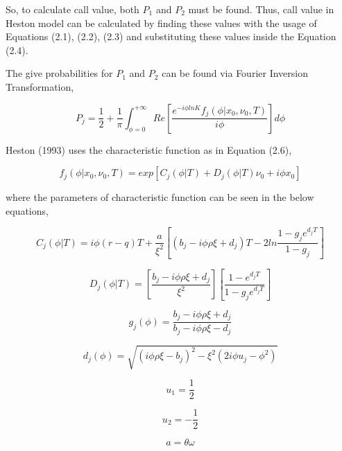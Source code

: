 \documentclass[fontsize=12pt]{article}
\numberwithin{equation}{section} %
\numberwithin{figure}{section} %
\numberwithin{table}{section} %
\begin{document}
	So, to calculate call value, both $P_1$ and $P_2$ must be found. Thus, call value in Heston model can be calculated by finding these values with the usage of Equations (2.1), (2.2), (2.3) and substituting these values inside the Equation (2.4). 

The give probabilities for $P_1$ and $P_2$ can be found via Fourier Inversion Transformation,

\begin{equation}
P_j = \frac{1}{2} + \frac{1}{\pi} \int_{\phi=0}^{+\infty} Re [\frac{e^{-i\phi ln K}f_j(\phi | x_0, \nu_0, T)}{i\phi}]d\phi
\end{equation}

Heston (1993) uses the characteristic function as in Equation (2.6),

\begin{equation}
f_j(\phi | x_0, \nu_0, T)= exp[C_j(\phi | T) + D_j(\phi | T)\nu_0 + i\phi x_0]
\end{equation}

where the parameters of  characteristic function can be seen in the below equations,

\begin{equation}
C_j(\phi | T)=i\phi(r-q)T + \frac{a}{\xi^2}[(b_j - i\phi \rho \xi + d_j)T - 2 ln \frac{1- g_j e^{d_j T}}{1-g_j}]
\end{equation}

\begin{equation}
D_j(\phi | T)= [\frac{b_j - i\phi \rho \xi + d_j}{\xi^2}] [\frac{1- e^{d_j T}}{1-g_j e^{d_j T}}]
\end{equation}

\begin{equation}
g_j(\phi)=\frac{b_j - i\phi \rho \xi + d_j}{b_j - i\phi \rho \xi - d_j}
\end{equation}

\begin{equation}
d_j(\phi)=\sqrt{(i\phi \rho \xi - b_j)^2 - \xi^2 (2 i \phi u_j - \phi^2)}
\end{equation}

\begin{equation}
u_1=\frac{1}{2}
\end{equation}

\begin{equation}
u_2=-\frac{1}{2}
\end{equation}

\begin{equation}
a=\theta \omega
\end{equation}
\end{document}
